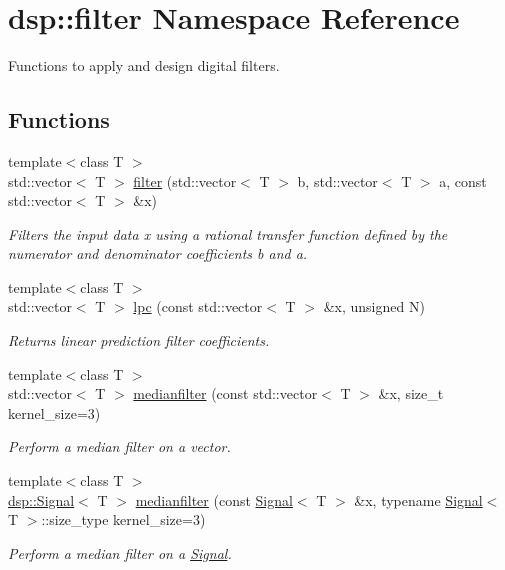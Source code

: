 \hypertarget{namespacedsp_1_1filter}{}\section{dsp\+:\+:filter Namespace Reference}
\label{namespacedsp_1_1filter}


Functions to apply and design digital filters.  


\subsection*{Functions}
\begin{DoxyCompactItemize}
\item 
{\footnotesize template$<$class T $>$ }\\std\+::vector$<$ T $>$ \mbox{\hyperlink{namespacedsp_1_1filter_a859b055ad5e9bb08b0cf5f6534f2d838}{filter}} (std\+::vector$<$ T $>$ b, std\+::vector$<$ T $>$ a, const std\+::vector$<$ T $>$ \&x)
\begin{DoxyCompactList}\small\item\em Filters the input data x using a rational transfer function defined by the numerator and denominator coefficients b and a. \end{DoxyCompactList}\item 
{\footnotesize template$<$class T $>$ }\\std\+::vector$<$ T $>$ \mbox{\hyperlink{namespacedsp_1_1filter_a30f29b332fc860fe07b12e7b515101c5}{lpc}} (const std\+::vector$<$ T $>$ \&x, unsigned N)
\begin{DoxyCompactList}\small\item\em Returns linear prediction filter coefficients. \end{DoxyCompactList}\item 
{\footnotesize template$<$class T $>$ }\\std\+::vector$<$ T $>$ \mbox{\hyperlink{namespacedsp_1_1filter_abb22b1c3577694682a3ee2915478f83b}{medianfilter}} (const std\+::vector$<$ T $>$ \&x, size\+\_\+t kernel\+\_\+size=3)
\begin{DoxyCompactList}\small\item\em Perform a median filter on a vector. \end{DoxyCompactList}\item 
{\footnotesize template$<$class T $>$ }\\\mbox{\hyperlink{classdsp_1_1_signal}{dsp\+::\+Signal}}$<$ T $>$ \mbox{\hyperlink{namespacedsp_1_1filter_add1c69a61917e8767e7ea36dee5d9801}{medianfilter}} (const \mbox{\hyperlink{classdsp_1_1_signal}{Signal}}$<$ T $>$ \&x, typename \mbox{\hyperlink{classdsp_1_1_signal}{Signal}}$<$ T $>$\+::size\+\_\+type kernel\+\_\+size=3)
\begin{DoxyCompactList}\small\item\em Perform a median filter on a \mbox{\hyperlink{classdsp_1_1_signal}{Signal}}. \end{DoxyCompactList}\end{DoxyCompactItemize}


